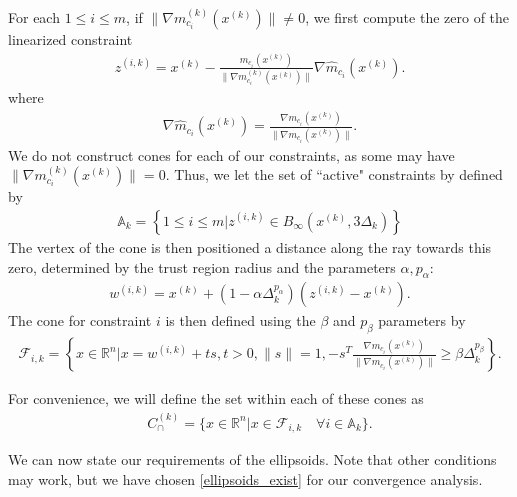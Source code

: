 \documentclass{article}
\theoremstyle{case}
\newcommand{\xk}{{x^{(k)}}}
\newcommand{\Rn}{\mathbb R^n}
\newcommand{\dk}{\Delta_k}
\newcommand{\zik}{{z^{(i, k)}}}
\newcommand{\fik}{{\mathcal F_{i, k}}}
\newcommand{\wik}{{w^{(i, k)}}}
\newcommand{\gmcik}{{\nabla m_{c_i}^{(k)}(\xk)}}
\newcommand{\hgik}{{\frac{\nabla m_{c_i}(\xk)}{\|\nabla m_{c_i}(\xk)\|}}}
\newcommand{\hgmcik}{{\nabla \hat m_{c_i}(\xk)}}
\newcommand{\capcones}{{C^{(k)}_{\cap}}}
\newcommand{\activeconstraintsk}{{\mathbb A_{k}}}
\begin{document}
For each $1\le i\le m$, if $\|\gmcik\| \ne 0$, we first compute the zero of the linearized constraint
\begin{align}
\zik = \xk - \frac{m_{c_i}(\xk)}{\|\gmcik\|} \hgmcik. \label{define_z}
\end{align}
where
\begin{align}
\hgmcik = \frac{\nabla m_{c_i}(\xk)}{\|\nabla m_{c_i}(\xk)\|}. \label{define_normalized_gradient}
\end{align}
We do not construct cones for each of our constraints, as some may have $\|\gmcik\| = 0$.
Thus, we let the set of ``active" constraints by defined by 
\begin{align}
\activeconstraintsk = \left\{1 \le i \le m | \zik \in B_{\infty}(\xk, 3\dk)\right\} \label{define_activeconstraints}
\end{align}
The vertex of the cone is then positioned a distance along the ray towards this zero, determined by the trust region radius and the parameters $\alpha, p_{\alpha}$:
\begin{align}
\wik = \xk + \left(1 - \alpha\dk^{p_{\alpha}}\right)\left(\zik - \xk\right). \label{define_w}
\end{align}
The cone for constraint $i$ is then defined using the $\beta$ and $p_{\beta}$ parameters by
\begin{align}
\fik = \left\{x \in \Rn | x = \wik + t s,t > 0, \|s\| = 1, -s^T\hgik \ge \beta \dk^{p_{\beta}} \right\}. \label{define_fik}
\end{align}

For convenience, we will define the set within each of these cones as
\begin{align}
\label{define_capcones}
\capcones = \{x\in\Rn | x \in \fik \quad \forall i \in \activeconstraintsk \}.
\end{align}




We can now state our requirements of the ellipsoids.
Note that other conditions may work, but we have chosen \cref{ellipsoids_exist} for our convergence analysis.
\end{document}
